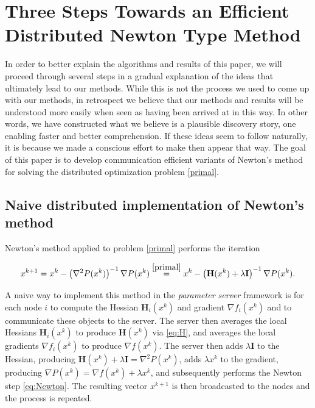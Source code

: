 \documentclass[12pt]{article}
\newcommand{\mH}{\mathbf{H}}
\newcommand{\mI}{\mathbf{I}}
\begin{document}
\section{Three Steps Towards an Efficient Distributed Newton Type Method} \label{sec:3steps}

In order to better explain the  algorithms and results of this paper, we will proceed through several steps in a gradual explanation of the ideas that ultimately lead to our methods. While this is not the process we used to come up with our methods, in retrospect we believe that our methods and results will be understood more easily when seen as having been arrived at in this way. In other words, we have constructed what we believe is a plausible discovery story, one enabling faster and better comprehension. If these ideas seem to follow naturally, it is because we made a conscious effort to make then appear that way. The goal of this paper is to develop communication efficient variants of Newton's method for solving the distributed optimization problem \eqref{primal}.   

\subsection{Naive distributed implementation of Newton's method} \label{subsec:Newton}


 Newton's method applied to problem \eqref{primal}  performs the iteration
 
 \begin{equation} \label{eq:Newton} x^{k+1} = x^k - \left(\nabla^2 P(x^k)\right)^{-1} \nabla P(x^k) \overset{\eqref{primal}}{=} x^k - \left(\mH(x^k) +\lambda \mI \right)^{-1} \nabla P(x^k).\end{equation}
 
A naive way to implement this method in the {\em parameter server} framework is for each node $i$ to compute the Hessian $\mH_i(x^k)$ and gradient $\nabla f_i(x^k)$ and to communicate these objects to the server. The server then averages the local Hessians $\mH_i(x^k)$ to produce $\mH(x^k)$ via \eqref{eq:H}, and averages the local gradients $\nabla f_i(x^k)$ to produce $\nabla f(x^k)$. The server then adds $\lambda \mI$ to the Hessian, producing $\mH(x^k) + \lambda \mI = \nabla^2 P(x^k)$, adds  $\lambda x^k$ to the gradient, producing $\nabla P(x^k) = \nabla f(x^k) + \lambda x^k$, and subsequently performs the Newton step \eqref{eq:Newton}. The resulting vector $x^{k+1}$ is then broadcasted to the nodes and the process is repeated. 
\end{document}
